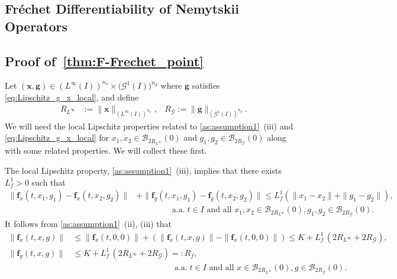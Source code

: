 \documentclass[onefignum,onetabnum]{siamart220329}
\numberwithin{equation}{section}
\newcommand{\aall}{\mbox{ a.a.} \;}
\newcommand{\bff}{\ensuremath{\mathbf{f}}} %
\newcommand{\bg}{\ensuremath{\mathbf{g}}} %
\newcommand{\bx}{\ensuremath{\mathbf{x}}} %
\newcommand {\cB} {\mathcal{B}}
\newcommand {\cG} {\mathcal{G}}
\begin{document}
%       
\begin{appendix}

\section[Fr\'echet Differentiability of Nemytskii Operators]{Fr\'echet Differentiability of Nemytskii Operators} \label{sec:sensitivity_proof}

\subsection*{Proof of~\cref{thm:F-Frechet_point}}
    Let $(\bx, \bg) \in (L^\infty(I))^{n_x} \times \big(\cG^1(I)\big)^{n_g}$ where $\bg$ satisfies \cref{eq:Lipschitz_g_x_local}, and define
    \begin{align*}
    	R_{L^\infty} &:= \| \bx \|_{(L^\infty(I))^{n_x}}, & 
	R_\cG := \| \bg \|_{(\cG^1(I))^{n_g}}.
    \end{align*}
    We will need the local Lipschitz properties related to \cref{as:assumption1}~(iii) and  \cref{eq:Lipschitz_g_x_local}
    for $x_1, x_2 \in \cB_{2 R_{L^\infty}}(0)$ and $g_1, g_2 \in \cB_{2 R_\cG}(0)$ along with some related properties.
    We will collect these first.
    
    The local Lipschitz property, \cref{as:assumption1}~(iii), implies that there exists $L^1_f > 0$ such that
    \begin{equation} \label{eq:Lipschitz_f'}
    \begin{aligned}    
    		\| \bff_x(t, x_1, g_1) - \bff_x(t, x_2, g_2) \| &+ \| \bff_g(t, x_1, g_1) - \bff_g(t, x_2, g_2) \| 
		\leq L^1_f ( \| x_1 - x_2 \| + \| g_1 - g_2 \| ), \\
		&\qquad \qquad \aall t \in I \mbox{ and all } x_1, x_2 \in \cB_{2 R_{L^\infty}}(0), g_1, g_2 \in \cB_{2 R_\cG}(0).
    \end{aligned}
    \end{equation}
    It follows from \cref{as:assumption1}~(ii), (iii) that
    \begin{equation}
    \begin{aligned}
        \|  \bff_x( t, x, g )  \|    
        & \le  \|  \bff_x( t, 0, 0 )  \|   +  ( \|  \bff_x( t, x, g )  \|   -   \|  \bff_x( t, 0, 0 )  \|  )
        \le K  + L^1_f \,  (  2 R_{L^\infty} +  2 R_\cG ), \\
        \|  \bff_g( t, x, g )  \|    
        & \le K  + L^1_f \, (  2 R_{L^\infty} +  2 R_\cG ) =: R_f, \\
        &\qquad \qquad \qquad \qquad \qquad \qquad \aall t \in I \mbox{ and all } x \in \cB_{2 R_{L^\infty}}(0), g \in \cB_{2 R_\cG}(0).
    \label{eq:bound_f'}
    \end{aligned}
    \end{equation}
    

\end{appendix}
\end{document}
